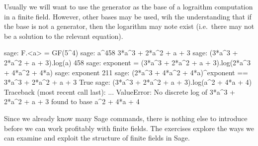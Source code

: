 %
Usually we will want to use the generator as the base of a lograithm computation in a finite field.  However, other bases may be used, wih the understanding that if the base is not a generator, then the logarithm may note exist (i.e.\ there may not be a solution to the relevant equation).
%
\begin{sageexample}
sage: F.<a> = GF(5^4)
sage: a^458
3*a^3 + 2*a^2 + a + 3
sage: (3*a^3 + 2*a^2 + a + 3).log(a)
458
sage: exponent = (3*a^3 + 2*a^2 + a + 3).log(2*a^3 + 4*a^2 + 4*a)
sage: exponent
211
sage: (2*a^3 + 4*a^2 + 4*a)^exponent == 3*a^3 + 2*a^2 + a + 3
True
sage: (3*a^3 + 2*a^2 + a + 3).log(a^2 + 4*a + 4)
Traceback (most recent call last):
...
ValueError: No discrete log of 3*a^3 + 2*a^2 + a + 3 found
to base a^2 + 4*a + 4
\end{sageexample}
%
Since we already know many Sage commands, there is nothing else to introduce before we can work profitably with finite fields.  The exercises explore the ways we can examine and exploit the structure of finite fields in Sage.
%
